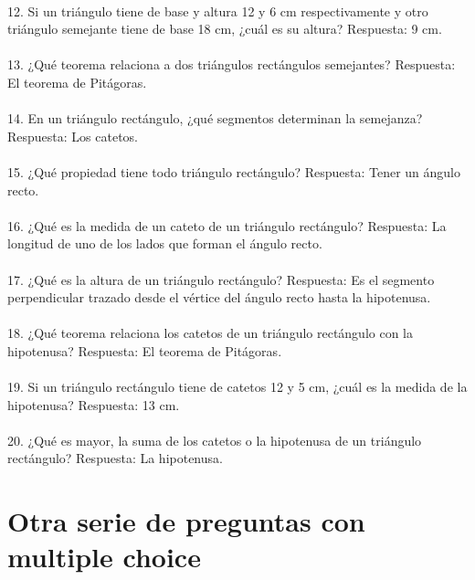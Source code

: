 \documentclass{article}
\begin{document}
\\
12. Si un triángulo tiene de base y altura 12 y 6 cm respectivamente y otro triángulo semejante tiene de base 18 cm, ¿cuál es su altura? Respuesta: 9 cm.\\
\\
13. ¿Qué teorema relaciona a dos triángulos rectángulos semejantes? Respuesta: El teorema de Pitágoras. \\
\\
14. En un triángulo rectángulo, ¿qué segmentos determinan la semejanza? Respuesta: Los catetos.\\
\\
15. ¿Qué propiedad tiene todo triángulo rectángulo? Respuesta: Tener un ángulo recto.\\
\\
16. ¿Qué es la medida de un cateto de un triángulo rectángulo? Respuesta: La longitud de uno de los lados que forman el ángulo recto. \\
\\
17. ¿Qué es la altura de un triángulo rectángulo? Respuesta: Es el segmento perpendicular trazado desde el vértice del ángulo recto hasta la hipotenusa. \\
\\
18. ¿Qué teorema relaciona los catetos de un triángulo rectángulo con la hipotenusa? Respuesta: El teorema de Pitágoras.\\
\\
19. Si un triángulo rectángulo tiene de catetos 12 y 5 cm, ¿cuál es la medida de la hipotenusa? Respuesta: 13 cm.\\
\\
20. ¿Qué es mayor, la suma de los catetos o la hipotenusa de un triángulo rectángulo? Respuesta: La hipotenusa.\\
\section{Otra serie de preguntas con multiple choice}
\end{document}
